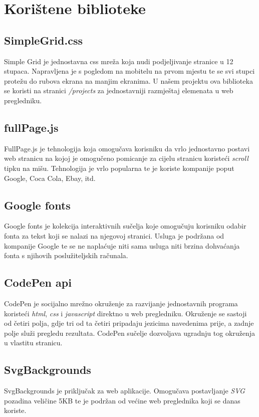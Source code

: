 \documentclass[times, utf8, zavrsni, numeric]{fer}
\begin{document}
\section{Korištene biblioteke}
\subsection{SimpleGrid.css}
\qquad Simple Grid je jednostavna css mreža koja nudi podjeljivanje stranice u 12 stupaca.
Napravljena je s pogledom na mobitelu na prvom mjestu te se svi stupci protežu do rubova ekrana na manjim ekranima.
U našem projektu ova biblioteka se koristi na stranici \textit{/projects} za jednostavniji razmještaj elemenata u web pregledniku.
\subsection{fullPage.js}
\qquad FullPage.js je tehnologija koja omogučava korisniku da vrlo jednostavno postavi web stranicu na kojoj je omogučeno pomicanje za cijelu stranicu koristeći \textit{scroll} tipku\footnotemark{} na mišu.
Tehnologija je vrlo popularna te je koriste kompanije poput Google, Coca Cola, Ebay, itd.
\subsection{Google fonts}
\qquad Google fonts je kolekcija interaktivnih sučelja koje omogučuju korisniku odabir fonta za tekst koji se nalazi na njegovoj stranici.
Usluga je podržana od kompanije Google te se ne naplaćuje niti sama usluga niti brzina dohvaćanja fonta s njihovih poslužiteljskih računala.
\subsection{CodePen api}
\qquad CodePen je socijalno mrežno okruženje za razvijanje jednostavnih programa koristeći \textit{html}, \textit{css} i \textit{javascript} direktno u web pregledniku.
Okruženje se sastoji od četiri polja, gdje tri od ta četiri pripadaju jezicima navedenima prije, a zadnje polje služi pregledu rezultata.
CodePen sučelje dozvoljava ugradnju tog okruženja u vlastitu stranicu.
\subsection{SvgBackgrounds}
\qquad SvgBackgrounds je priključak za web aplikacije.
Omogučava postavljanje \textit{SVG}\footnotemark{} pozadina veličine 5KB te je podržan od većine web preglednika koji se danas koriste.
\end{document}
